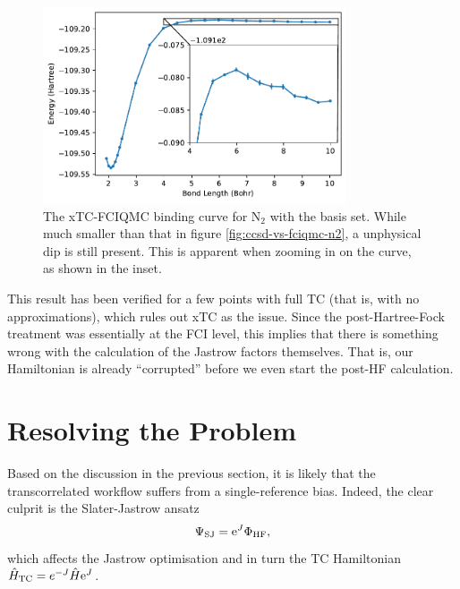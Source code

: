 \begin{figure}[htbp]
    \centering
    \includegraphics[width=0.8\textwidth]{figures/binding/inset_nontcfciqmc}
    \caption{The xTC-FCIQMC binding curve for N$_2$ with the \avtz basis set. While much smaller than that in figure \ref{fig:ccsd-vs-fciqmc-n2}, a unphysical dip is still present. This is apparent when zooming in on the curve, as shown in the inset.}
    \label{fig:binding-dip}
\end{figure}

This result has been verified for a few points with full TC (that is, with no approximations), which rules out xTC as the issue. Since the post-Hartree-Fock treatment was essentially at the FCI level, this implies that there is something wrong with the calculation of the Jastrow factors themselves. That is, our Hamiltonian is already ``corrupted'' before we even start the post-HF calculation.


\section{Resolving the Problem}

Based on the discussion in the previous section, it is likely that the transcorrelated workflow suffers from a single-reference bias. Indeed, the clear culprit is the Slater-Jastrow ansatz
\begin{equation}
    \label{eq:slater-jastrow-unichap}
    \Psi_\mathrm{SJ} = \mathrm{e}^J\Phi_\mathrm{HF},
\end{equation}
which affects the Jastrow optimisation and in turn the TC Hamiltonian $\hat H_\mathrm{TC} = e^{-J}\hat H\mathrm{e}^J$.

